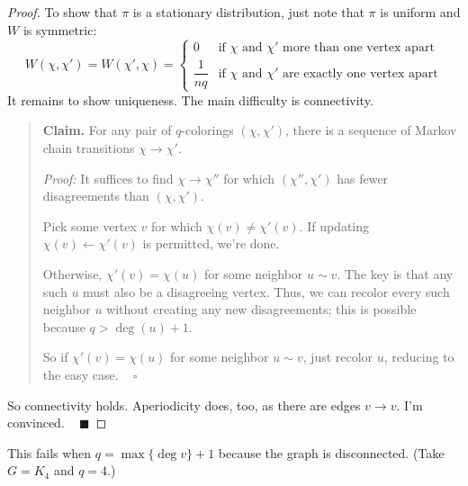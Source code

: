 \begin{proof}
    To show that $\pi$ is a stationary distribution, just note that $\pi$ is uniform and $W$ is symmetric:
    \[ W(\chi, \chi') = W(\chi', \chi) = \begin{cases} 0 & \text{if $\chi$ and $\chi'$ more than one vertex apart} \\ \dfrac{1}{nq} & \text{if $\chi$ and $\chi'$ are exactly one vertex apart} \end{cases} \]
    It remains to show uniqueness.  The main difficulty is connectivity.
    \begin{quote}
        \textbf{Claim.} For any pair of $q$-colorings $(\chi, \chi')$, there is a sequence of Markov chain transitions $\chi \to \chi'$.

        \emph{Proof:} It suffices to find $\chi \to \chi''$ for which $(\chi'', \chi')$ has fewer disagreements than $(\chi, \chi')$.

        Pick some vertex $v$ for which $\chi(v) \neq \chi'(v)$.  If updating $\chi(v) \leftarrow \chi'(v)$ is permitted, we're done.  
        
        Otherwise, $\chi'(v) = \chi(u)$ for some neighbor $u \sim v$.  The key is that any such $u$ must also be a disagreeing vertex.  Thus, we can recolor every such neighbor $u$ without creating any new disagreements; this is possible because $q > \deg(u) + 1$.

        So if $\chi'(v) = \chi(u)$ for some neighbor $u \sim v$, just recolor $u$, reducing to the easy case. ~ $\square$
    \end{quote}
    So connectivity holds.  Aperiodicity does, too, as there are edges $v \to v$.  I'm convinced. ~ $\blacksquare$
\end{proof}

\begin{remark}
    This fails when $q = \max \{ \deg v \} + 1$ because the graph is disconnected.  (Take $G = K_4$ and $q = 4$.)
\end{remark}


